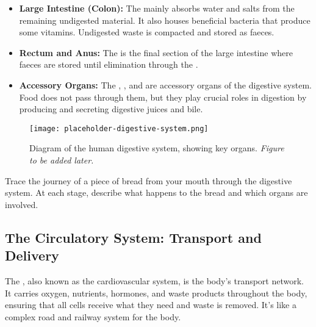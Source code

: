 \begin{itemize}
    \item \textbf{Large Intestine (Colon):}  The  mainly absorbs water and salts from the remaining undigested material.  It also houses beneficial bacteria that produce some vitamins.  Undigested waste is compacted and stored as faeces.

    \item \textbf{Rectum and Anus:}  The  is the final section of the large intestine where faeces are stored until elimination through the .

    \item \textbf{Accessory Organs:}  The , , and  are accessory organs of the digestive system. Food does not pass through them, but they play crucial roles in digestion by producing and secreting digestive juices and bile.

\end{itemize}

\begin{figure}[htb]
    \centering
    \texttt{[image: placeholder-digestive-system.png]}
    \caption{Diagram of the human digestive system, showing key organs. \textit{Figure to be added later.}}
    \label{fig:digestive-system}
\end{figure}

\begin{stopandthink}
Trace the journey of a piece of bread from your mouth through the digestive system.  At each stage, describe what happens to the bread and which organs are involved.
\end{stopandthink}


\subsection{The Circulatory System: Transport and Delivery}

The , also known as the cardiovascular system, is the body's transport network.  It carries oxygen, nutrients, hormones, and waste products throughout the body, ensuring that all cells receive what they need and waste is removed.  It's like a complex road and railway system for the body.

